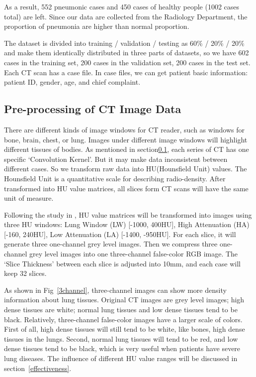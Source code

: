 \documentclass[journal]{IEEEtran}
\begin{document}
As a result, 552 pneumonic cases and 450 cases of healthy people (1002 cases total) are left. Since our data are collected from the Radiology Department, the proportion of pneumonia are higher than normal proportion.

The dataset is divided into training / validation / testing as 60\% / 20\% / 20\% and make them identically distributed in three parts of datasets, so we have 602 cases in the training set, 200 cases in the validation set, 200 cases in the test set.
Each CT scan has a case file. In case files, we can get patient basic information: patient ID, gender, age, and chief complaint. 

\subsection{Pre-processing of CT Image Data}
\label{ctimagedata}
There are different kinds of image windows for CT reader, such as windows for bone, brain, chest, or lung. Images under different image windows will highlight different tissues of bodies.
As mentioned in section\ref{ctimagedata}, each series of CT has one specific `Convolution Kernel'. But it may make data inconsistent between different cases. So we transform raw data into HU(Hounsfield Unit) values. The Hounsfield Unit is a quantitative scale for describing radio-density. After transformed into HU value matrices, all slices form CT scans will have the same unit of measure.

Following the study in \cite{Shin2017Three, gao2018holistic}, HU value matrices will be transformed into images using three HU windows: Lung Window (LW) [-1000, 400HU], High Attenuation (HA) [-160, 240HU], Low Attenuation (LA) [-1400, -950HU]. 
For each slice, it will generate three one-channel grey level images. Then we compress three one-channel grey level images into one three-channel false-color RGB image. The `Slice Thickness' between each slice is adjusted into 10mm, and each case will keep 32 slices.

As shown in Fig~\ref{3channel}, three-channel images can show more density information about lung tissues. Original CT images are grey level images; high dense tissues are white; normal lung tissues and low dense tissues tend to be black. 
Relatively, three-channel false-color images have a larger scale of colors. First of all, high dense tissues will still tend to be white, like bones, high dense tissues in the lungs. Second, normal lung tissues will tend to be red, and low dense tissues tend to be black, which is very useful when patients have severe lung diseases.
The influence of different HU value ranges will be discussed in section~\ref{effectiveness}.
    
\end{document}
